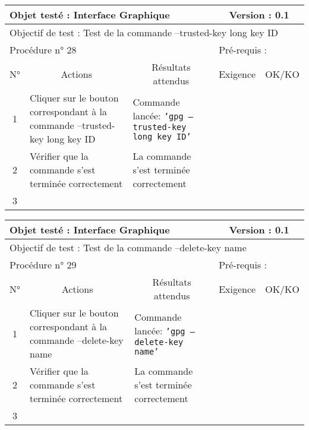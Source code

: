 \documentclass{../res/univ-projet}
\begin{document}
\begin{center}
\begin{tabular}{|c|p{5cm}|p{5cm}|p{1.5cm}|p{1.5cm}|}
\hline
\multicolumn{3}{|l|}{Objet testé : Interface Graphique} & \multicolumn{2}{c|}{Version : 0.1}\\ \hline
\multicolumn{5}{|l|}{Objectif de test : Test de la commande –trusted-key long key ID}\\ \hline
\multicolumn{3}{|l|}{Procédure n° 28} & \multicolumn{2}{p{3cm}|}{Pré-requis : }\\ \hline
\multicolumn{1}{|c|}{N°} & \multicolumn{1}{c|}{Actions} & \multicolumn{1}{c|}{Résultats attendus} & 
\multicolumn{1}{c|}{Exigence} & \multicolumn{1}{c|}{OK/KO}\\ \hline
1 & Cliquer sur le bouton correspondant à la commande –trusted-key long key ID & Commande lancée: \texttt{'gpg –trusted-key long key ID'} &  & \\
2 & Vérifier que la commande s'est terminée correctement & La commande s'est terminée correctement &  & \\
3 &  &  &  & \\ \hline
\end{tabular}
\vskip 2.2cm


\begin{tabular}{|c|p{5cm}|p{5cm}|p{1.5cm}|p{1.5cm}|}
\hline
\multicolumn{3}{|l|}{Objet testé : Interface Graphique} & \multicolumn{2}{c|}{Version : 0.1}\\ \hline
\multicolumn{5}{|l|}{Objectif de test : Test de la commande –delete-key name}\\ \hline
\multicolumn{3}{|l|}{Procédure n° 29} & \multicolumn{2}{p{3cm}|}{Pré-requis : }\\ \hline
\multicolumn{1}{|c|}{N°} & \multicolumn{1}{c|}{Actions} & \multicolumn{1}{c|}{Résultats attendus} & 
\multicolumn{1}{c|}{Exigence} & \multicolumn{1}{c|}{OK/KO}\\ \hline
1 & Cliquer sur le bouton correspondant à la commande –delete-key name & Commande lancée: \texttt{'gpg –delete-key name'} &  & \\
2 & Vérifier que la commande s'est terminée correctement & La commande s'est terminée correctement &  & \\
3 &  &  &  & \\ \hline
\end{tabular}
\vskip 2.2cm



\end{center}
\end{document}

